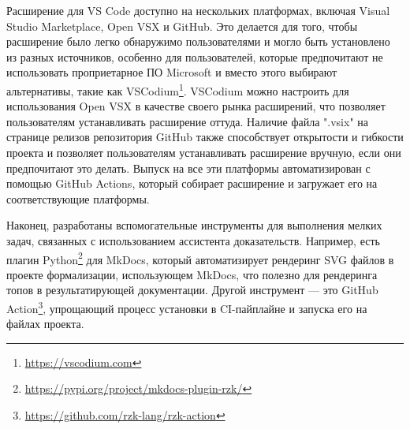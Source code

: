 Расширение для VS Code доступно на нескольких платформах, включая Visual Studio Marketplace, Open VSX и GitHub. Это делается для того, чтобы расширение было легко обнаружимо пользователями и могло быть установлено из разных источников, особенно для пользователей, которые предпочитают не использовать проприетарное ПО Microsoft и вместо этого выбирают альтернативы, такие как VSCodium\footnote{\url{https://vscodium.com}}. VSCodium можно настроить для использования Open VSX в качестве своего рынка расширений, что позволяет пользователям устанавливать расширение оттуда. Наличие файла ".vsix" на странице релизов репозитория GitHub также способствует открытости и гибкости проекта и позволяет пользователям устанавливать расширение вручную, если они предпочитают это делать. Выпуск на все эти платформы автоматизирован с помощью GitHub Actions, который собирает расширение и загружает его на соответствующие платформы.

Наконец, разработаны вспомогательные инструменты для выполнения мелких задач, связанных с использованием ассистента доказательств. Например, есть плагин Python\footnote{\url{https://pypi.org/project/mkdocs-plugin-rzk/}} для MkDocs, который автоматизирует рендеринг SVG файлов в проекте формализации, использующем MkDocs, что полезно для рендеринга топов в результатирующей документации. Другой инструмент — это GitHub Action\footnote{\url{https://github.com/rzk-lang/rzk-action}}, упрощающий процесс установки \Rzk{} в CI-пайплайне и запуска его на файлах проекта.
